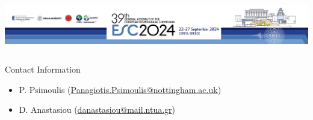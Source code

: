 \documentclass[final,a0,portrait]{beamer}
\newlength{\sepwid}
\newlength{\onecolwid}
\newlength{\twocolwid}
\newlength{\threecolwid}
\begin{document}
\begin{frame}[t]
\begin{columns}[t]
\begin{column}{\onecolwid}
\vskip-1.5cm
\begin{minipage}{\threecolwid}
  \begin{column}{\twocolwid}
		\vspace*{1.0\baselineskip}
		\begin{center}
		  \includegraphics[width=.97\textwidth]{figures/ESC2024_webheader.png}
		\end{center}
  \end{column}
  \begin{column}{\onecolwid}
  \vspace*{1.0\baselineskip}
    \begin{alertblock}{Contact Information}
    {\small
  		\begin{itemize}
	  		\item P. Psimoulis (\href{Panagiotis.Psimoulis@nottingham.ac.uk}{Panagiotis.Psimoulis@nottingham.ac.uk})
		  	\item D. Anastasiou (\href{danastasiou@mail.ntua.gr}{danastasiou@mail.ntua.gr})
		  \end{itemize}
		  }
  	\end{alertblock}
  \end{column}
\end{minipage}

%





\end{column}
\end{columns}
\end{frame}
\end{document}

